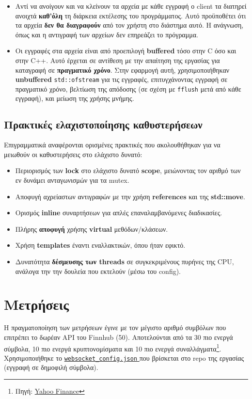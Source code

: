 \documentclass[12pt]{article}
\newcommand{\config}{\href{https://github.com/Selivanof/university-collection/tree/main/RealTime_Embedded_Systems/performance/websocket_config.json}{\texttt{websocket\_config.json} }}
\begin{document}
\begin{itemize}
    \item Αντί να ανοίγουν και να κλείνουν τα αρχεία με κάθε εγγραφή ο client τα διατηρεί ανοιχτά \textbf{καθ'όλη} τη διάρκεια εκτέλεσης του προγράμματος. Αυτό προϋποθέτει ότι τα αρχεία \textbf{δεν θα διαγραφούν} από τον χρήστη στο διάστημα αυτό. Η ανάγνωση, όπως και η αντιγραφή των αρχείων δεν επηρεάζει το πρόγραμμα.
    \item Οι εγγραφές στα αρχεία είναι από προεπιλογή \textbf{buffered} τόσο στην C όσο και στην C++. Αυτό έρχεται σε αντίθεση με την απαίτηση της εργασίας για καταγραφή σε \textbf{πραγματικό χρόνο}. Στην εφαρμογή αυτή, χρησιμοποιήθηκαν \textbf{unbuffered} \texttt{std::ofstream} για τις εγγραφές, επιτυγχάνοντας εγγραφή σε πραγματικό χρόνο, βελτίωση της απόδοσης (σε σχέση με \texttt{fflush} μετά από κάθε εγγραφή), και μείωση της χρήσης μνήμης.
\end{itemize}

\subsection{Πρακτικές ελαχιστοποίησης καθυστερήσεων}
Επιγραμματικά αναφέρονται ορισμένες πρακτικές που ακολουθήθηκαν για να μειωθούν οι καθυστερήσεις στο ελάχιστο δυνατό:
\begin{itemize}
\setlength\itemsep{0em}
    \item Περιορισμός των \textbf{lock} στο ελάχιστο δυνατό \textbf{scope}, μειώνοντας τον αριθμό των εν δυνάμει ανταγωνισμών για τα mutex.
    \item Αποφυγή αχρείαστων αντιγραφών με την χρήση \textbf{references} και της \textbf{std::move}.
    \item Ορισμός \textbf{inline} συναρτήσεων για απλές επαναλαμβανόμενες διαδικασίες.
    \item Πλήρης \textbf{αποφυγή} χρήσης \textbf{virtual} μεθόδων/κλάσεων.
    \item Χρήση \textbf{templates} έναντι εναλλακτικών, όπου ήταν εφικτό.
    \item Δυνατότητα \textbf{δέσμευσης των threads} σε συγκεκριμένους πυρήνες της CPU, ανάλογα την την δουλεία που εκτελούν (μέσω του config).
\end{itemize}

\section{Μετρήσεις}
Η πραγματοποίηση των μετρήσεων έγινε με τον μέγιστο αριθμό συμβόλων που επιτρέπει το δωρέαν API του Finnhub (50). Αποτελούνται από τα 30 πιο ενεργά σύμβολα, 10 πιο ενεργά κρυπτονομίσματα και 10 πιο ενεργά συναλλάγματα\footnote{Πηγή: \href{https://finance.yahoo.com/markets}{Yahoo Finance}}. Χρησιμοποιήθηκε το \config που βρίσκεται στο repo της εργασίας (εγγραφή σε δημοφιλή σύμβολα). 
\end{document}
